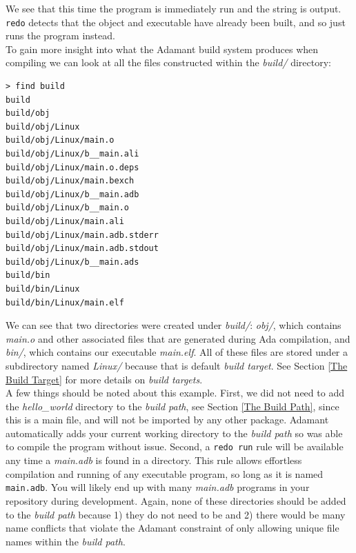 We see that this time the program is immediately run and the string is output. \texttt{redo} detects that the object and executable have already been built, and so just runs the program instead. \\

To gain more insight into what the Adamant build system produces when compiling we can look at all the files constructed within the \textit{build/} directory:

\vspace{5mm} %
\begin{verbatim}
> find build
build
build/obj
build/obj/Linux
build/obj/Linux/main.o
build/obj/Linux/b__main.ali
build/obj/Linux/main.o.deps
build/obj/Linux/main.bexch
build/obj/Linux/b__main.adb
build/obj/Linux/b__main.o
build/obj/Linux/main.ali
build/obj/Linux/main.adb.stderr
build/obj/Linux/main.adb.stdout
build/obj/Linux/b__main.ads
build/bin
build/bin/Linux
build/bin/Linux/main.elf
\end{verbatim}
\vspace{5mm} %

We can see that two directories were created under \textit{build/}: \textit{obj/}, which contains \textit{main.o} and other associated files that are generated during Ada compilation, and \textit{bin/}, which contains our executable \textit{main.elf}. All of these files are stored under a subdirectory named \textit{Linux/} because that is default \textit{build target}. See Section \ref{The Build Target} for more details on \textit{build targets}. \\

A few things should be noted about this example. First, we did not need to add the \textit{hello\_world} directory to the \textit{build path}, see Section \ref{The Build Path}, since this is a main file, and will not be imported by any other package. Adamant automatically adds your current working directory to the \textit{build path} so was able to compile the program without issue. Second, a \texttt{redo run} rule will be available any time a \textit{main.adb} is found in a directory. This rule allows effortless compilation and running of any executable program, so long as it is named \texttt{main.adb}. You will likely end up with many \textit{main.adb} programs in your repository during development. Again, none of these directories should be added to the \textit{build path} because 1) they do not need to be and 2) there would be many name conflicts that violate the Adamant constraint of only allowing unique file names within the \textit{build path}. \\

